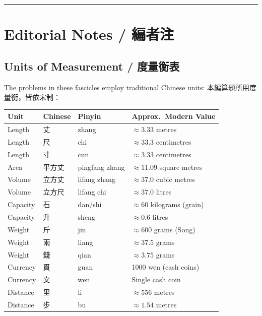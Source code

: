 \documentclass[11pt,a4paper]{article}
\newcommand{\longline}{\noindent\rule{\textwidth}{0.4pt}}
\begin{document}
\vspace{0.5em}
\longline

\newpage
\section*{Editorial Notes / 編者注}

\subsection*{Units of Measurement / 度量衡表}

The problems in these fascicles employ traditional Chinese units:
本編算題所用度量衡，皆依宋制：

\vspace{0.5em}

\begin{center}
\begin{longtable}{llll}
\toprule
\textbf{Unit} & \textbf{Chinese} & \textbf{Pinyin} & \textbf{Approx.~Modern Value} \\
\midrule
\endfirsthead
Length & 丈 & zhang & $\approx 3.33$ metres \\
Length & 尺 & chi & $\approx 33.3$ centimetres \\
Length & 寸 & cun & $\approx 3.33$ centimetres \\
Area & 平方丈 & pingfang zhang & $\approx 11.09$ square metres \\
Volume & 立方丈 & lifang zhang & $\approx 37.0$ cubic metres \\
Volume & 立方尺 & lifang chi & $\approx 37.0$ litres \\
Capacity & 石 & dan/shi & $\approx 60$ kilograms (grain) \\
Capacity & 升 & sheng & $\approx 0.6$ litres \\
Weight & 斤 & jin & $\approx 600$ grams (Song) \\
Weight & 兩 & liang & $\approx 37.5$ grams \\
Weight & 錢 & qian & $\approx 3.75$ grams \\
Currency & 貫 & guan & 1000 wen (cash coins) \\
Currency & 文 & wen & Single cash coin \\
Distance & 里 & li & $\approx 556$ metres \\
Distance & 步 & bu & $\approx 1.54$ metres \\
\bottomrule
\end{longtable}
\end{center}
\end{document}
